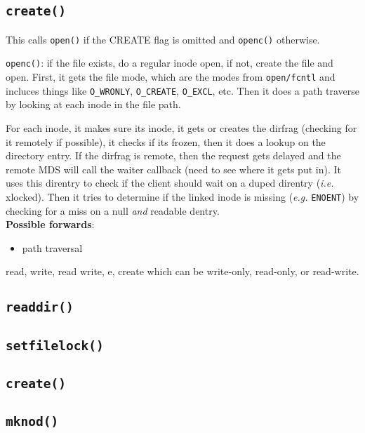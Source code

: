 \documentclass[conference]{acm_proc_article-sp} \usepackage[english]{babel}
\begin{document}
\subsection{\texttt{create()}}

This calls \texttt{open()} if the CREATE flag is omitted and  \texttt{openc()}
otherwise.

\texttt{openc()}: if the file exists, do a regular inode open, if not, create
the file and open. First, it gets the file mode, which are the modes from
\texttt{open/fcntl} and incluces things like \texttt{O\_WRONLY},
\texttt{O\_CREATE}, \texttt{O\_EXCL}, etc. Then it does a path traverse by
looking at each inode in the file path. 

For each inode, it makes sure its inode, it gets or creates the dirfrag
(checking for it remotely if possible), it checks if its frozen, then it does a
lookup on the directory entry. If the dirfrag is remote, then the request gets
delayed and the remote MDS will call the waiter callback (need to see where it
gets put in). It uses this direntry to check if the client should wait on a
duped direntry ({\it i.e.} xlocked). Then it tries to determine if the linked
inode is missing ({\it e.g.} \texttt{ENOENT}) by checking for a miss on a null
{\it and} readable dentry.\\

\noindent\textbf{Possible forwards}: 

\begin{itemize} \item path traversal \end{itemize}

read, write, read write, e, create which can be write-only, read-only, or
read-write. 

\subsection{\texttt{readdir()}} \subsection{\texttt{setfilelock()}}

\subsection{\texttt{create()}} \subsection{\texttt{mknod()}}
\end{document}
